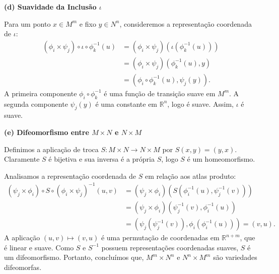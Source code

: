 {	\textbf{(d) Suavidade da Inclusão $\iota$}
	
	Para um ponto $x \in M^m$ e fixo $y \in N^n$, consideremos a representação coordenada de $\iota$:
	\begin{align*}
		(\phi_i \times \psi_j) \circ \iota \circ \phi_k^{-1}(u) &= (\phi_i \times \psi_j)(\iota(\phi_k^{-1}(u))) \\
		&= (\phi_i \times \psi_j)(\phi_k^{-1}(u), y) \\
		&= (\phi_i \circ \phi_k^{-1}(u), \psi_j(y)).
	\end{align*}
	A primeira componente $\phi_i \circ \phi_k^{-1}$ é uma função de transição suave em $M^m$. A segunda componente $\psi_j(y)$ é uma constante em $\mathbb{R}^n$, logo é suave. Assim, $\iota$ é suave.
	
	\textbf{(e) Difeomorfismo entre $M \times N$ e $N \times M$}
	
	Definimos a aplicação de troca $S: M \times N \to N \times M$ por $S(x, y) = (y, x)$. Claramente $S$ é bijetiva e sua inversa é a própria $S$, logo $S$ é um homeomorfismo.
	
	Analisamos a representação coordenada de $S$ em relação aos atlas produto:
	\begin{align*}
		(\psi_j \times \phi_i) \circ S \circ (\phi_i \times \psi_j)^{-1}(u, v) &= (\psi_j \times \phi_i)(S(\phi_i^{-1}(u), \psi_j^{-1}(v))) \\
		&= (\psi_j \times \phi_i)(\psi_j^{-1}(v), \phi_i^{-1}(u)) \\
		&= (\psi_j(\psi_j^{-1}(v)), \phi_i(\phi_i^{-1}(u))) = (v, u).
	\end{align*}
	A aplicação $(u, v) \mapsto (v, u)$ é uma permutação de coordenadas em $\mathbb{R}^{n+m}$, que é linear e suave. Como $S$ e $S^{-1}$ possuem representações coordenadas suaves, $S$ é um difeomorfismo. Portanto, concluímos que, $M^m \times N^n$ e $N^n \times M^m$ são variedades difeomorfas.
}
